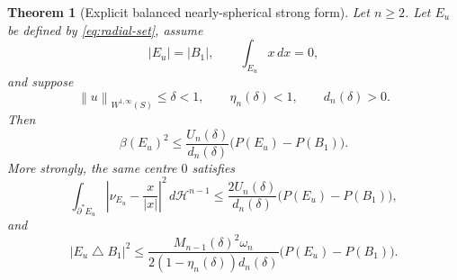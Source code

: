 \documentclass[11pt]{amsart}
\newtheorem{theorem}{Theorem}[section]
\theoremstyle{definition}
\newcommand{\Hn}{\mathcal H^{n-1}}
\newcommand{\norm}[1]{\left\|#1\right\|}
\newcommand{\Per}{P}
\begin{document}
\begin{theorem}[Explicit balanced nearly-spherical strong form]
\label{thm:graph-main}
Let \(n\ge2\).  Let \(E_u\) be defined by \eqref{eq:radial-set}, assume
\[
   |E_u|=|B_1|,\qquad \int_{E_u}x\,dx=0,
\tag{3.17}\label{eq:graph-balanced}
\]
and suppose
\[
   \norm{u}_{W^{1,\infty}(S)}\le\delta<1,\qquad
   \eta_n(\delta)<1,\qquad d_n(\delta)>0.
\tag{3.18}\label{eq:graph-hyp}
\]
Then
\[
   \beta(E_u)^2
   \le \frac{U_n(\delta)}{d_n(\delta)}
      \bigl(\Per(E_u)-\Per(B_1)\bigr).
\tag{3.19}\label{eq:graph-beta}
\]
More strongly, the same centre \(0\) satisfies
\[
   \int_{\partial^*E_u}
       \left|\nu_{E_u}-\frac{x}{|x|}\right|^2\,d\Hn
   \le
   \frac{2U_n(\delta)}{d_n(\delta)}
      \bigl(\Per(E_u)-\Per(B_1)\bigr),
\tag{3.20}\label{eq:graph-normal-bound}
\]
and
\[
   |E_u\mathbin{\triangle}B_1|^2
   \le
   \frac{M_{n-1}(\delta)^2\omega_n}
        {2(1-\eta_n(\delta))d_n(\delta)}
      \bigl(\Per(E_u)-\Per(B_1)\bigr).
\tag{3.21}\label{eq:graph-volume-bound}
\]
\end{theorem}
\end{document}
